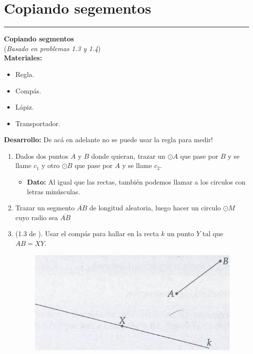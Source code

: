 \section{Copiando segementos}\label{Copiando_segmentos}
\rule{\textwidth}{0.1mm}
\begin{act_clase} \textbf{Copiando segmentos} \\ (\textit{Basado en \cite{Aops_Geometria} problemas 1.3 y 1.4}){\ \\}
	\textbf{Materiales:} 
	\begin{itemize}
		\item Regla.
		\item Compás.
		\item Lápiz.
		\item Transportador.
	\end{itemize}
	
	\textbf{Desarrollo:} De acá en adelante no se puede usar la regla para medir!
	\begin{enumerate}
		\item Dados dos puntos $A$ y $B$ donde quieran, trazar un $\odot A$ que pase por $B$ y se llame $c_1$ y otro $\odot B$ que pase por $A$ y se llame $c_2$. \vspace{8cm}
		
		\begin{itemize}
				\item \textbf{Dato:} Al igual que las rectas, también podemos llamar a los circulos con letras minúsculas.
		\end{itemize}
	
		\item Trazar un segmento $\overline{AB}$ de longitud aleatoria, luego hacer un circulo $\odot M$ cuyo radio sea $\overline{AB}$
		\vspace{6cm}
		
		\item (1.3 de \cite{Aops_Geometria}). Usar el compás para hallar en la recta $k$ un punto $Y$ tal que $AB=XY$.
			\begin{figure}[H]
				\centering
				\includegraphics[width=0.8\linewidth]{Geometria/imgs/aops_geo_1_3}
				\label{aops_geo_1_3}
			\end{figure}


\end{enumerate}
\end{act_clase}
